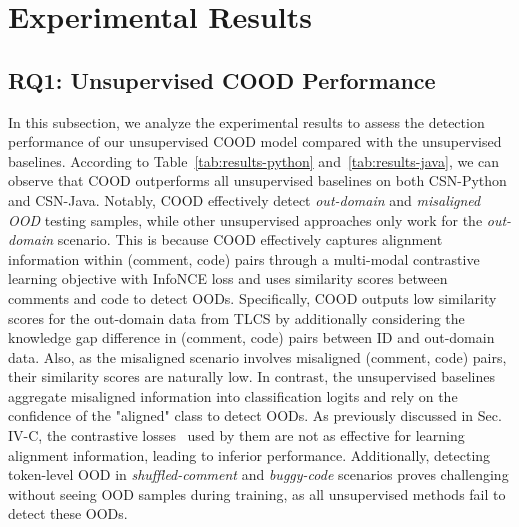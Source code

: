 

\section{Experimental Results}\label{sec:results}
\subsection{RQ1: Unsupervised COOD Performance}
In this subsection, we analyze the experimental results to assess the detection performance of our unsupervised COOD model compared with the unsupervised baselines. According to Table~\ref{tab:results-python} and~\ref{tab:results-java}, we can observe that COOD outperforms all unsupervised baselines on both CSN-Python and CSN-Java. Notably, COOD effectively detect \textit{out-domain} and \textit{misaligned OOD} testing samples, while other unsupervised approaches only work for the \textit{out-domain} scenario. This is because COOD effectively captures alignment information within (comment, code) pairs through a multi-modal contrastive learning objective with InfoNCE loss and uses similarity scores between comments and code to detect OODs. Specifically, COOD outputs low similarity scores for the out-domain data from TLCS by additionally considering the knowledge gap difference in (comment, code) pairs between ID and out-domain data. Also, as the misaligned scenario involves misaligned (comment, code) pairs, their similarity scores are naturally low. In contrast, the unsupervised baselines aggregate misaligned information into classification logits and rely on the confidence of the "aligned" class to detect OODs. As previously discussed in Sec. IV-C, the contrastive losses~\cite{khosla2020supervised, zhou2021contrastive} used by them are not as effective for learning alignment information, leading to inferior performance. Additionally, detecting token-level OOD in \textit{shuffled-comment} and \textit{buggy-code} scenarios proves challenging without seeing OOD samples during training, as all unsupervised methods fail to detect these OODs. 



